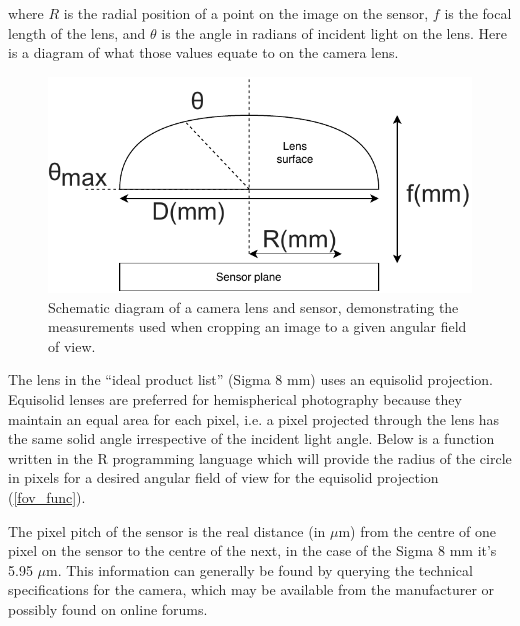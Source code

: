 \documentclass[11pt,a4paper]{article}
\newcommand\file[1]{\texttt{\underline{#1}}}
\begin{document}
where $R$ is the radial position of a point on the image on the sensor, $f$ is the focal length of the lens, and $\theta$ is the angle in radians of incident light on the lens. Here is a diagram of what those values equate to on the camera lens.

\begin{figure}[H]
\centering
	\includegraphics[width=\textwidth]{fov_diagram.drawio}
	\caption{Schematic diagram of a camera lens and sensor, demonstrating the measurements used when cropping an image to a given angular field of view.}
	\label{fov_diagram}
\end{figure}

The lens in the ``ideal product list'' (Sigma 8 mm) uses an equisolid projection. Equisolid lenses are preferred for hemispherical photography because they maintain an equal area for each pixel, i.e. a pixel projected through the lens has the same solid angle irrespective of the incident light angle. Below is a function written in the R programming language which will provide the radius of the circle in pixels for a desired angular field of view for the equisolid projection (\autoref{fov_func}).

\begin{minipage}{\linewidth}

\end{minipage}

The pixel pitch of the sensor is the real distance (in $\mu$m) from the centre of one pixel on the sensor to the centre of the next, in the case of the Sigma 8 mm it's 5.95 $\mu$m. This information can generally be found by querying the technical specifications for the camera, which may be available from the manufacturer or possibly found on online forums.
\end{document}
